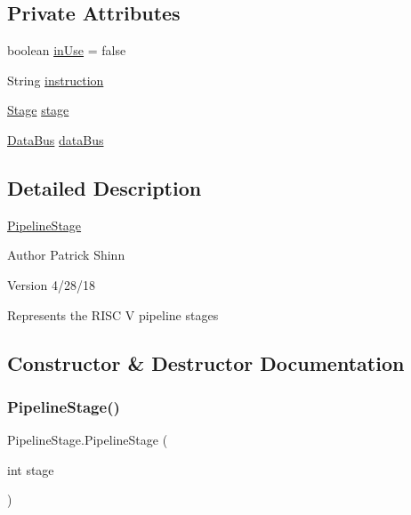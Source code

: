 \subsection*{Private Attributes}
\begin{DoxyCompactItemize}
\item 
boolean \mbox{\hyperlink{class_pipeline_stage_a3ac73b767158fba9e6875514845d1d97}{in\+Use}} = false
\item 
String \mbox{\hyperlink{class_pipeline_stage_a489ee0d4b3d0eee31ec60b9cb24a0e36}{instruction}}
\item 
\mbox{\hyperlink{enum_stage}{Stage}} \mbox{\hyperlink{class_pipeline_stage_a8e9a5f7315a4d88213c4ad0949048f34}{stage}}
\item 
\mbox{\hyperlink{class_data_bus}{Data\+Bus}} \mbox{\hyperlink{class_pipeline_stage_abf7e2ce98acaa474f4be90e14fda0f26}{data\+Bus}}
\end{DoxyCompactItemize}


\subsection{Detailed Description}
\mbox{\hyperlink{class_pipeline_stage}{Pipeline\+Stage}}

\begin{DoxyAuthor}{Author}
Patrick Shinn 
\end{DoxyAuthor}
\begin{DoxyVersion}{Version}
4/28/18
\end{DoxyVersion}
Represents the R\+I\+SC V pipeline stages 

\subsection{Constructor \& Destructor Documentation}
\mbox{\label{class_pipeline_stage_af608b65a2a3bb7d9fcf3d860152104a2}} 
\subsubsection{\texorpdfstring{Pipeline\+Stage()}{PipelineStage()}}
{\footnotesize\ttfamily Pipeline\+Stage.\+Pipeline\+Stage (\begin{DoxyParamCaption}\item[{int}]{stage }\end{DoxyParamCaption})\hspace{0.3cm}{\ttfamily [package]}}



